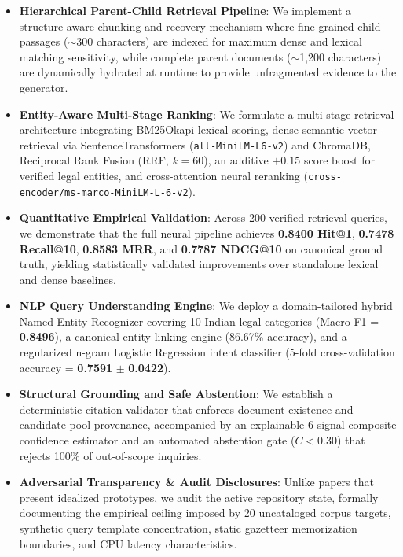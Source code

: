 \documentclass[10pt,twocolumn]{article}
\begin{document}
\begin{itemize}[leftmargin=*]
    \item \textbf{Hierarchical Parent-Child Retrieval Pipeline}: We implement a structure-aware chunking and recovery mechanism where fine-grained child passages ($\sim$300 characters) are indexed for maximum dense and lexical matching sensitivity, while complete parent documents ($\sim$1,200 characters) are dynamically hydrated at runtime to provide unfragmented evidence to the generator.
    \item \textbf{Entity-Aware Multi-Stage Ranking}: We formulate a multi-stage retrieval architecture integrating BM25Okapi lexical scoring, dense semantic vector retrieval via SentenceTransformers (\texttt{all-MiniLM-L6-v2}) and ChromaDB, Reciprocal Rank Fusion (RRF, $k=60$), an additive $+0.15$ score boost for verified legal entities, and cross-attention neural reranking (\texttt{cross-encoder/ms-marco-MiniLM-L-6-v2}).
    \item \textbf{Quantitative Empirical Validation}: Across 200 verified retrieval queries, we demonstrate that the full neural pipeline achieves \textbf{0.8400 Hit@1}, \textbf{0.7478 Recall@10}, \textbf{0.8583 MRR}, and \textbf{0.7787 NDCG@10} on canonical ground truth, yielding statistically validated improvements over standalone lexical and dense baselines.
    \item \textbf{NLP Query Understanding Engine}: We deploy a domain-tailored hybrid Named Entity Recognizer covering 10 Indian legal categories (Macro-F1 = \textbf{0.8496}), a canonical entity linking engine (86.67\% accuracy), and a regularized n-gram Logistic Regression intent classifier (5-fold cross-validation accuracy = \textbf{0.7591} $\pm$ \textbf{0.0422}).
    \item \textbf{Structural Grounding and Safe Abstention}: We establish a deterministic citation validator that enforces document existence and candidate-pool provenance, accompanied by an explainable 6-signal composite confidence estimator and an automated abstention gate ($C < 0.30$) that rejects 100\% of out-of-scope inquiries.
    \item \textbf{Adversarial Transparency \& Audit Disclosures}: Unlike papers that present idealized prototypes, we audit the active repository state, formally documenting the empirical ceiling imposed by 20 uncataloged corpus targets, synthetic query template concentration, static gazetteer memorization boundaries, and CPU latency characteristics.
\end{itemize}
\end{document}
